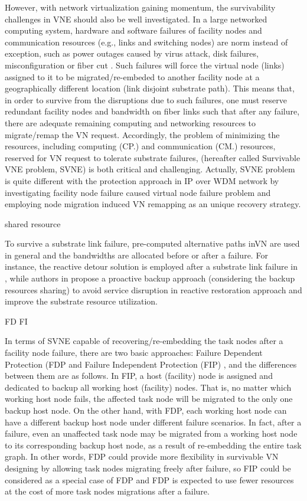 However, with network virtualization gaining momentum, the survivability challenges in VNE should also be well investigated. In a large networked computing system, hardware and software failures of facility nodes and communication resources (e.g., links and switching nodes) are norm instead of exception, such as power outages caused by virus attack, disk failures, misconfiguration or fiber cut \cite{xu2012survivable,rahman2010survivable,rahman2013svne,guo2011shared,chen2010resilient}. Such failures will force the virtual node (links) assigned to it to be migrated/re-embeded to another facility node at a geographically different location (link disjoint substrate path). This means that, in order to survive from the disruptions due to such failures, one must reserve redundant facility nodes and bandwidth on fiber links such that after any failure, there are adequate remaining computing and networking resources to migrate/remap the VN request. Accordingly, the problem of minimizing the resources, including computing (CP.) and communication (CM.) resources, reserved for VN request to tolerate substrate failures, (hereafter called Survivable
VNE problem, SVNE) is both critical and challenging. Actually, SVNE problem is quite different with the protection approach
in IP over WDM network by investigating facility node failure caused virtual node failure problem and employing node migration induced VN remapping as an unique recovery strategy.

shared resource

To survive a substrate link failure, pre-computed alternative paths inVN are used in general and the bandwidths are allocated before or after a failure. For instance, the reactive detour solution is employed after a substrate link failure in \cite{rahman2010survivable}, while authors in \cite{rahman2013svne,guo2011shared} propose a proactive backup approach (considering the backup resources sharing) to avoid service disruption in reactive restoration approach and improve the substrate resource utilization.


FD  FI

In terms of SVNE capable of recovering/re-embedding the task nodes after a facility node failure, there are two basic approaches: Failure Dependent Protection (FDP \cite{yu2010survivable} and Failure Independent Protection (FIP) \cite{yeow2011designing}, and the differences between them are as follows. In FIP, a host (facility) node is assigned and dedicated to backup all working host (facility) nodes. That is, no matter which working host node fails, the affected task node will be migrated to the only one backup host node. On the other hand, with FDP, each working host node can have a different backup host node under different failure scenarios. In fact, after a failure, even an unaffected task node may be migrated from a working host node to its corresponding backup host node, as a result of re-embedding the entire task graph. In other words, FDP could provide more flexibility in survivable VN designing by allowing task nodes migrating freely after failure, so FIP could be considered as a special case of FDP and FDP is expected to use fewer resources at the cost of more task nodes migrations after a failure.


